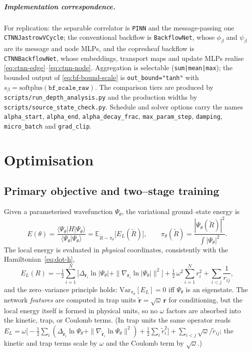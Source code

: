 \paragraph{Implementation correspondence.} For replication: the separable correlator is
\texttt{PINN} and the message-passing one \texttt{CTNNJastrowVCycle}; the conventional
backflow is \texttt{BackflowNet}, whose $\phi_\beta$ and $\psi_\beta$ are its message and
node MLPs, and the copresheaf backflow is \texttt{CTNNBackflowNet}, whose embeddings,
transport maps and update MLPs realise \eqref{eq:ctnn-edge}--\eqref{eq:ctnn-node}.
Aggregation is selectable (\texttt{sum|mean|max}); the bounded output of
\eqref{eq:bf-bound-scale} is \texttt{out\_bound="tanh"} with
$s_\beta=\mathrm{softplus}(\texttt{bf\_scale\_raw})$. The comparison tiers are produced by
\texttt{scripts/run\_depth\_analysis.py} and the production widths by
\texttt{scripts/source\_state\_check.py}. Schedule and solver options carry the names
\texttt{alpha\_start}, \texttt{alpha\_end}, \texttt{alpha\_decay\_frac},
\texttt{max\_param\_step}, \texttt{damping}, \texttt{micro\_batch} and \texttt{grad\_clip}.

\chapter{Optimisation}
\label{ch:optimisation}
\label{ch:optimization}

\section{Primary objective and two–stage training}
\label{sec:opt-overview}

Given a parameterised wavefunction $\Psi_\theta$, the variational ground–state energy is
\begin{equation}
E(\theta)
=\frac{\langle\Psi_\theta|H|\Psi_\theta\rangle}{\langle\Psi_\theta|\Psi_\theta\rangle}
=\mathbb{E}_{\tilde{R}\sim \pi_\theta}\!\big[E_L(\tilde{R})\big],
\qquad
\pi_\theta(\tilde{R})=\frac{|\Psi_\theta(\tilde{R})|^2}{\int |\Psi_\theta|^2}.
\end{equation}
The local energy is evaluated in \emph{physical} coordinates, consistently with the
Hamiltonian~\eqref{eq:dot-h},
\begin{equation}
\label{eq:local-energy}
E_L(R)
= -\tfrac12\sum_{i=1}^N\!\Big[\Delta_{\mathbf r_i}\ln|\Psi_\theta| + \|\nabla_{\mathbf r_i}\ln|\Psi_\theta|\|^2\Big]
+\tfrac{1}{2}\,\omega^2\sum_{i=1}^N r_i^2
+\sum_{i<j}\frac{1}{r_{ij}},
\end{equation}
and the zero–variance principle holds: $\mathrm{Var}_{\pi_\theta}[E_L]=0$ iff $\Psi_\theta$ is an eigenstate.
The network \emph{features} are computed in trap units $\tilde{\mathbf r}=\sqrt{\omega}\,\mathbf r$
for conditioning, but the local energy itself is formed in physical units, so no
$\omega$ factors are absorbed into the kinetic, trap, or Coulomb terms. (In trap units
the same operator reads $E_L=\omega\big[-\tfrac12\sum_i(\Delta_{\tilde{\mathbf r}_i}\ln\Psi_\theta+\|\nabla_{\tilde{\mathbf r}_i}\ln\Psi_\theta\|^2)+\tfrac12\sum_i\tilde r_i^2\big]+\sum_{i<j}\sqrt{\omega}/\tilde r_{ij}$;
the kinetic and trap terms scale by $\omega$ and the Coulomb term by $\sqrt{\omega}$.)

